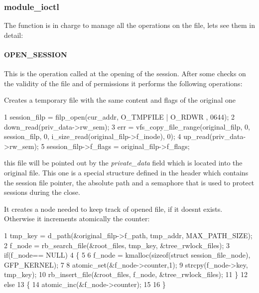 \subsubsection*{module\+\_\+ioctl}

The function is in charge to manage all the operations on the file, let\textquotesingle{}s see them in detail\+:

\paragraph*{O\+P\+E\+N\+\_\+\+S\+E\+S\+S\+I\+ON}

This is the operation called at the opening of the session. After some checks on the validity of the file and of permissions it performs the following operations\+:


\begin{DoxyItemize}
\item Creates a temporary file with the same content and flags of the original one
\end{DoxyItemize}


\begin{DoxyCode}
1 session\_filp = filp\_open(cur\_addr, O\_TMPFILE | O\_RDWR  , 0644);
2 down\_read(priv\_data->rw\_sem);
3 err = vfs\_copy\_file\_range(original\_filp, 0, session\_filp, 0, i\_size\_read(original\_filp->f\_inode), 0);
4 up\_read(priv\_data->rw\_sem);
5 session\_filp->f\_flags = original\_filp->f\_flags;
\end{DoxyCode}
 this file will be pointed out by the {\itshape private\+\_\+data} field which is located into the original file. This one is a special structure defined in the header which contains the session file pointer, the absolute path and a semaphore that is used to protect sessions during the close.
\begin{DoxyItemize}
\item It creates a node needed to keep track of opened file, if it doesn\textquotesingle{}t exists. Otherwise it increments atomically the counter\+:
\end{DoxyItemize}


\begin{DoxyCode}
1 tmp\_key = d\_path(&original\_filp->f\_path, tmp\_addr, MAX\_PATH\_SIZE);
2             f\_node = rb\_search\_file(&root\_files, tmp\_key, &tree\_rwlock\_files);
3             if(f\_node== NULL)
4                 \{
5 
6                 f\_node = kmalloc(sizeof(struct session\_file\_node), GFP\_KERNEL);
7 
8                 atomic\_set(&f\_node->counter,1);
9                 strcpy(f\_node->key, tmp\_key);
10                 rb\_insert\_file(&root\_files, f\_node, &tree\_rwlock\_files);
11             \}
12             else
13             \{
14                 atomic\_inc(&f\_node->counter);
15 
16             \}
\end{DoxyCode}



